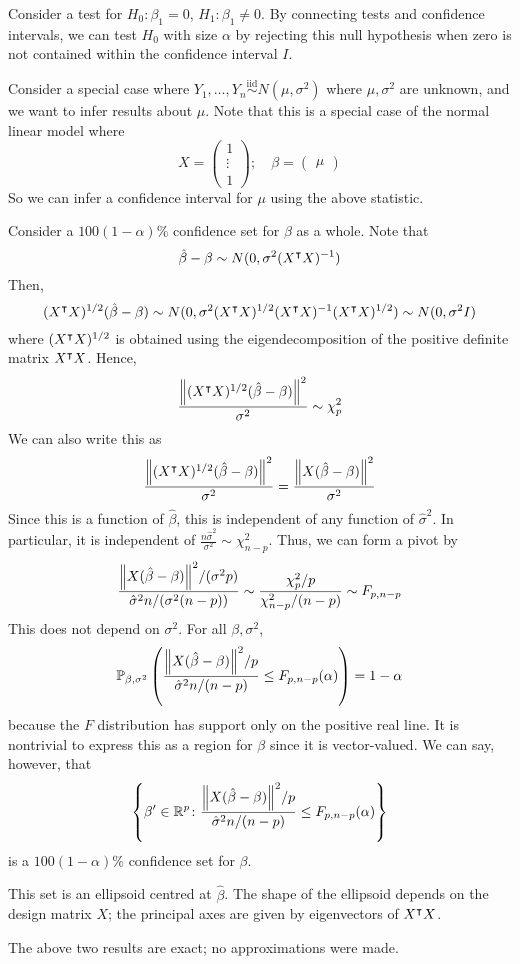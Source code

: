 \begin{example}
	Consider a test for \( H_0 \colon \beta_1 = 0 \), \( H_1 \colon \beta_1 \neq 0 \).
	By connecting tests and confidence intervals, we can test \( H_0 \) with size \( \alpha \) by rejecting this null hypothesis when zero is not contained within the confidence interval \( I \).

	Consider a special case where \( Y_1, \dots, Y_n \overset{\text{iid}}{\sim} N(\mu,\sigma^2) \) where \( \mu, \sigma^2 \) are unknown, and we want to infer results about \( \mu \).
	Note that this is a special case of the normal linear model where
	\[ X = \begin{pmatrix}
		1 \\
		\vdots \\
		1
	\end{pmatrix};\quad \beta = \begin{pmatrix}
		\mu
	\end{pmatrix} \]
	So we can infer a confidence interval for \( \mu \) using the above statistic.
\end{example}
\begin{example}
	Consider a \( 100(1-\alpha)\% \) confidence set for \( \beta \) as a whole.
	Note that
	\[ \hat \beta - \beta \sim N(0,\sigma^2 (X^\intercal X)^{-1}) \]
	Then,
	\[ (X^\intercal X)^{1/2} (\hat \beta - \beta) \sim N(0,\sigma^2(X^\intercal X)^{1/2} (X^\intercal X)^{-1} (X^\intercal X)^{1/2}) \sim N(0,\sigma^2 I) \]
	where \( (X^\intercal X)^{1/2} \) is obtained using the eigendecomposition of the positive definite matrix \( X^\intercal X \).
	Hence,
	\[ \frac{\norm{(X^\intercal X)^{1/2} (\hat \beta - \beta)}^2}{\sigma^2} \sim \chi^2_p \]
	We can also write this as
	\[ \frac{\norm{(X^\intercal X)^{1/2} (\hat \beta - \beta)}^2}{\sigma^2} = \frac{\norm{X(\hat \beta - \beta)}^2}{\sigma^2} \]
	Since this is a function of \( \hat \beta \), this is independent of any function of \( \hat \sigma^2 \).
	In particular, it is independent of \( \frac{n\hat\sigma^2}{\sigma^2} \sim \chi^2_{n-p} \).
	Thus, we can form a pivot by
	\[ \frac{\norm{X(\hat \beta - \beta)}^2 / (\sigma^2 p)}{\hat\sigma^2 n / (\sigma^2(n-p))} \sim \frac{\chi^2_p / p}{\chi^2_{n-p} / (n-p)} \sim F_{p,n-p} \]
	This does not depend on \( \sigma^2 \).
	For all \( \beta, \sigma^2 \),
	\[ \mathbb{P}_{\beta,\sigma^2}\left({
	\frac{\norm{X(\hat \beta - \beta)}^2 / p}{\hat\sigma^2 n / (n-p)}
	\leq F_{p,n-p}(\alpha)}\right) = 1-\alpha \]
	because the \( F \) distribution has support only on the positive real line.
	It is nontrivial to express this as a region for \( \beta \) since it is vector-valued.
	We can say, however, that
	\[ \qty{\beta' \in \mathbb R^p \colon \frac{\norm{X(\hat \beta - \beta)}^2/p}{\hat \sigma^2 n/(n-p)} \leq F_{p,n-p}(\alpha)} \]
	is a \( 100(1-\alpha)\% \) confidence set for \( \beta \).

	This set is an ellipsoid centred at \( \hat \beta \).
	The shape of the ellipsoid depends on the design matrix \( X \); the principal axes are given by eigenvectors of \( X^\intercal X \).
\end{example}
The above two results are exact; no approximations were made.

